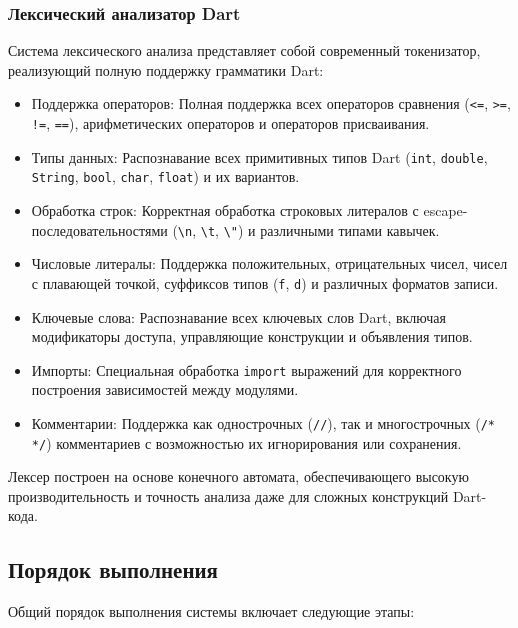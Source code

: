 \documentclass[14pt, russian]{scrartcl}
\begin{document}
\subsubsection{Лексический анализатор Dart}

Система лексического анализа представляет собой современный токенизатор, реализующий полную поддержку грамматики Dart:

\begin{itemize}
    \item Поддержка операторов: Полная поддержка всех операторов сравнения (\texttt{<=}, \texttt{>=}, \texttt{!=}, \texttt{==}), арифметических операторов и операторов присваивания.
    \item Типы данных: Распознавание всех примитивных типов Dart (\texttt{int}, \texttt{double}, \texttt{String}, \texttt{bool}, \texttt{char}, \texttt{float}) и их вариантов.
    \item Обработка строк: Корректная обработка строковых литералов с escape-последовательностями (\texttt{\textbackslash n}, \texttt{\textbackslash t}, \texttt{\textbackslash"}) и различными типами кавычек.
    \item Числовые литералы: Поддержка положительных, отрицательных чисел, чисел с плавающей точкой, суффиксов типов (\texttt{f}, \texttt{d}) и различных форматов записи.
    \item Ключевые слова: Распознавание всех ключевых слов Dart, включая модификаторы доступа, управляющие конструкции и объявления типов.
    \item Импорты: Специальная обработка \texttt{import} выражений для корректного построения зависимостей между модулями.
    \item Комментарии: Поддержка как однострочных (\texttt{//}), так и многострочных (\texttt{/* */}) комментариев с возможностью их игнорирования или сохранения.
\end{itemize}

Лексер построен на основе конечного автомата, обеспечивающего высокую производительность и точность анализа даже для сложных конструкций Dart-кода.

\subsection{Порядок выполнения}

Общий порядок выполнения системы включает следующие этапы:
\end{document}
